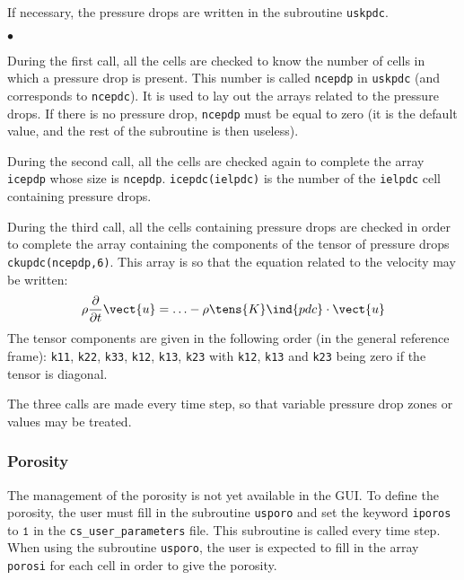 {{{If necessary, the pressure drops are written in the
subroutine \texttt{uskpdc}.

\begin{list}{$\bullet$}{}
\item During the first call, all the cells are checked to know the
      number of cells in which a pressure drop is present.
      This number is called \texttt{ncepdp} in
      \texttt{uskpdc} (and corresponds to
      \texttt{ncepdc}). It is used to lay out the arrays
      related to the pressure drops. If there is no pressure drop,
      \texttt{ncepdp} must be equal to zero (it is the default value, and the
      rest of the subroutine is then useless).

\item During the second call, all the cells are checked again to
      complete the array \texttt{icepdp} whose size is
      \texttt{ncepdp}. \mbox{\texttt{icepdc(ielpdc)}} is the number of the
      \texttt{ielpdc}\raisebox{1ex}{\small th} cell containing pressure drops.

\item During the third call, all the cells containing pressure drops
      are checked in order to complete the array
      containing the components of the tensor of pressure drops
      \mbox{\texttt{ckupdc(ncepdp,6)}}. This array is so that
      the equation related to the velocity may be written:
\begin{displaymath}
\rho\frac{\partial}{\partial t}\vect{u}=\ldots -\rho\tens{K}\ind{pdc}\cdot\vect{u}
\end{displaymath}
The tensor components are given in the following order (in the general
      reference frame): \texttt{k11}, \texttt{k22}, \texttt{k33}, \texttt{k12},
      \texttt{k13}, \texttt{k23} with \texttt{k12}, \texttt{k13} and \texttt{k23}
      being zero if the tensor is diagonal.

\end{list}


The three calls are made every time step, so that variable pressure drop
zones or values may be treated.

\subsubsection{Porosity}

The management of the porosity is not yet available in the GUI. To define the porosity, the user
must fill in the subroutine \texttt{usporo} and set the keyword \texttt{iporos} to $\texttt{1}$ in the
\texttt{cs\_user\_parameters} file. This subroutine is called every time step.\\
When using the subroutine \texttt{usporo}, the user is expected to fill in the array \texttt{porosi}
for each cell in order to give the porosity.

}}}
